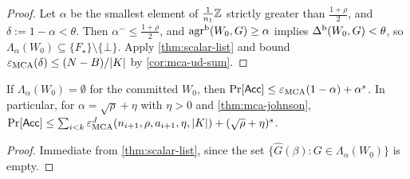 \begin{proof}
Let $\alpha$ be the smallest element of $\frac1{n_1}\mathbb{Z}$ strictly greater than
$\frac{1+\rho}2$, and $\delta:=1-\alpha<\theta$. Then $\alpha^-\le\frac{1+\rho}2$, and
$\mathrm{agr}^{\mathrm{b}}(W_0,G)\ge\alpha$ implies $\Delta^{\mathrm{b}}(W_0,G)<\theta$, so
$\Lambda_\alpha(W_0)\subseteq\{F_\star\}\setminus\{\bot\}$. Apply \cref{thm:scalar-list}
and bound $\varepsilon_{\mathrm{MCA}}(\delta)\le(N-B)/|K|$ by \cref{cor:mca-ud-sum}.
\end{proof}

\begin{corollary}\label{cor:scalar-proximity}
If $\Lambda_\alpha(W_0)=\emptyset$ for the committed $W_0$, then
$\Pr[\mathsf{Acc}]\le\varepsilon_{\mathrm{MCA}}(1-\alpha)+\alpha^s$. In particular, for
$\alpha=\sqrt\rho+\eta$ with $\eta>0$ and \cref{thm:mca-johnson},
$\Pr[\mathsf{Acc}]\le\sum_{i<k}\varepsilon^J_{\mathrm{MCA}}(n_{i+1},\rho,a_{i+1},\eta,|K|)+(\sqrt\rho+\eta)^s$.
\end{corollary}

\begin{proof}
Immediate from \cref{thm:scalar-list}, since the set
$\{\widehat G(\beta):G\in\Lambda_\alpha(W_0)\}$ is empty.
\end{proof}

